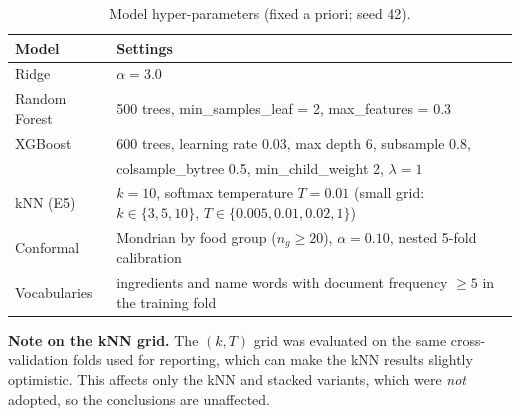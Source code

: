 \begin{table}[ht]
\centering\small
\caption{Model hyper-parameters (fixed a priori; seed 42).}
\begin{tabular}{@{}ll@{}}
\toprule
Model & Settings \\
\midrule
Ridge & $\alpha=3.0$ \\
Random Forest & 500 trees, min\_samples\_leaf = 2, max\_features = 0.3 \\
XGBoost & 600 trees, learning rate 0.03, max depth 6, subsample 0.8, \\
        & colsample\_bytree 0.5, min\_child\_weight 2, $\lambda=1$ \\
kNN (E5) & $k=10$, softmax temperature $T=0.01$ (small grid: $k\in\{3,5,10\}$, $T\in\{0.005,0.01,0.02,1\}$) \\
Conformal & Mondrian by food group ($n_g\ge20$), $\alpha=0.10$, nested 5-fold calibration \\
Vocabularies & ingredients and name words with document frequency $\ge5$ in the training fold \\
\bottomrule
\end{tabular}
\end{table}

\noindent\textbf{Note on the kNN grid.} The $(k,T)$ grid was evaluated on the same cross-validation
folds used for reporting, which can make the kNN results slightly optimistic. This affects only the
kNN and stacked variants, which were \emph{not} adopted, so the conclusions are unaffected.
